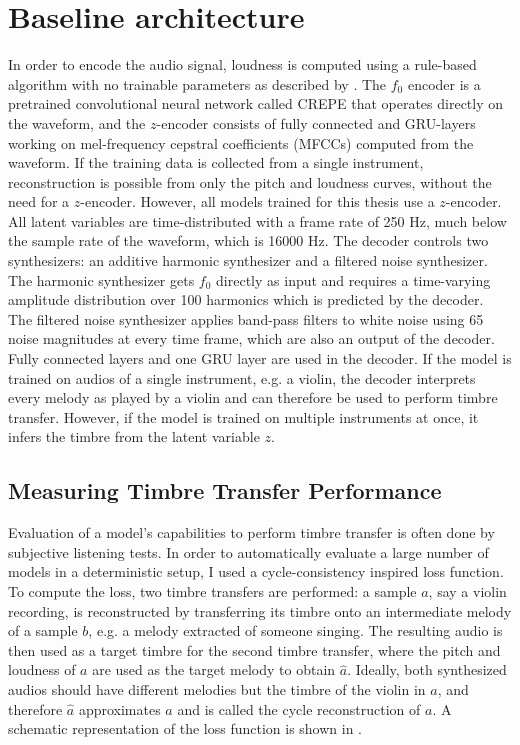 \section{Baseline architecture}
\label{baseline}
In order to encode the audio signal, loudness is computed using a rule-based algorithm with no trainable parameters as described by \citet{hantrakul_fast_2019-1}. The $f_0$ encoder is a pretrained convolutional neural network called CREPE that operates directly on the waveform, and the $z$-encoder consists of fully connected and GRU-layers \citep{chung_empirical_2014} working on mel-frequency cepstral coefficients (MFCCs) computed from the waveform. If the training data is collected from a single instrument, reconstruction is possible from only the pitch and loudness curves, without the need for a $z$-encoder. However, all models trained for this thesis use a $z$-encoder. All latent variables are time-distributed with a frame rate of 250 Hz, much below the sample rate of the waveform, which is 16000 Hz.\newline
The decoder controls two synthesizers: an additive harmonic synthesizer and a filtered noise synthesizer. The harmonic synthesizer gets $f_0$ directly as input and requires a time-varying amplitude distribution over 100 harmonics which is predicted by the decoder. \newline
The filtered noise synthesizer applies band-pass filters to white noise using 65 noise magnitudes at every time frame, which are also an output of the decoder.
Fully connected layers and one GRU layer are used in the decoder. \newline
If the model is trained on audios of a single instrument, e.g. a violin, the decoder interprets every melody as played by a violin and can therefore be used to perform timbre transfer.
However, if the model is trained on multiple instruments at once, it infers the timbre from the latent variable $z$. 


\subsection{Measuring Timbre Transfer Performance}
Evaluation of a model's capabilities to perform timbre transfer is often done by subjective listening tests.
In order to automatically evaluate a large number of models in a deterministic setup, I used a cycle-consistency inspired loss function.
To compute the loss, two timbre transfers are performed: a sample $a$, say a violin recording, is reconstructed by transferring its timbre onto an intermediate melody of a sample $b$, e.g. a melody extracted of someone singing.
The resulting audio is then used as a target timbre for the second timbre transfer, where the pitch and loudness of $a$ are used as the target melody to obtain $\hat{a}$.
Ideally, both synthesized audios should have different melodies but the timbre of the violin in $a$, and therefore $\hat{a}$ approximates $a$ and is called the cycle reconstruction of $a$. A schematic representation of the loss function is shown in .

